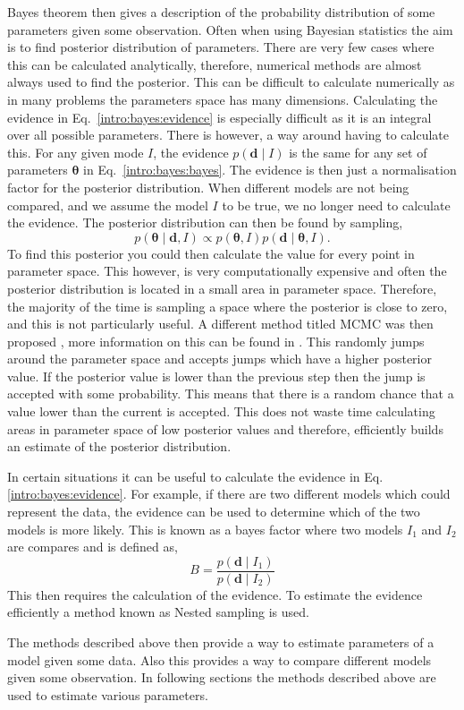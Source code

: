 Bayes theorem then gives a description of the probability distribution of some parameters given some observation.
Often when using Bayesian statistics the aim is to find posterior distribution of parameters.
There are very few cases where this can be calculated analytically, therefore, numerical methods are almost always used to find the posterior.
This can be difficult to calculate numerically as in many problems the parameters space has many dimensions.
Calculating the evidence in Eq.~\ref{intro:bayes:evidence} is especially difficult as it is an integral over all possible parameters.
There is however, a way around having to calculate this. For any given mode $I$, the evidence $p({\bm d}\mid I)$ is the same for any set of parameters ${\bm \theta}$ in Eq.~\ref{intro:bayes:bayes}. 
The evidence is then just a normalisation factor for the posterior distribution. 
When different models are not being compared, and we assume the model $I$ to be true, we no longer need to calculate the evidence.
The posterior distribution can then be found by sampling,
\begin{equation}
    p({\bm \theta} \mid {\bm d}, I) \propto p({\bm \theta}, I)p({\bm d} \mid {\bm \theta}, I).
\end{equation}
To find this posterior you could then calculate the value for every point in parameter space. This however, is very computationally expensive and often the posterior distribution is located in a small area in parameter space. 
Therefore, the majority of the time is sampling a space where the posterior is close to zero, and this is not particularly useful. 
A different method titled \ac{MCMC} was then proposed \citep{Metropolis1953EquationMachines}, more information on this can be found in \citep{vanRavenzwaaij2018ASampling,Sharma2017MarkovAstronomy}.
This randomly jumps around the parameter space and accepts jumps which have a higher posterior value. 
If the posterior value is lower than the previous step then the jump is accepted with some probability. This means that there is a random chance that a value lower than the current is accepted.
This does not waste time calculating areas in parameter space of low posterior values and therefore, efficiently builds an estimate of the posterior distribution.

In certain situations it can be useful to calculate the evidence in Eq.\ref{intro:bayes:evidence}. 
For example, if there are two different models which could represent the data, the evidence can be used to determine which of the two models is more likely.
This is known as a bayes factor where two models $I_1$ and $I_2$ are compares and is defined as,
\begin{equation}
    B = \frac{p({\bm d} \mid I_1)}{p({\bm d} \mid I_2)}
\end{equation}
This then requires the calculation of the evidence.
To estimate the evidence efficiently a method known as Nested sampling \citep{Skilling2006NestedComputation,Speagle2019Dynesty:Evidences} is used.

The methods described above then provide a way to estimate parameters of a model given some data. 
Also this provides a way to compare different models given some observation.
In following sections the methods described above are used to estimate various parameters.





